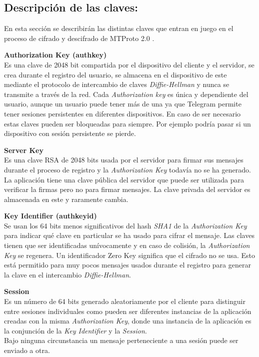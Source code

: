 \subsection{Descripción de las claves:}
En esta sección se describirán las distintas claves que entran en juego en el proceso de cifrado y descifrado de MTProto 2.0 \cite{telegram2}.

\begin{description}
	\item \textbf{Authorization Key (auth\textunderscore key)}\\
	Es una clave de 2048 bit compartida por el dispositivo del cliente y el servidor, se crea durante el registro del usuario, se almacena en el dispositivo de este mediante el protocolo de intercambio de claves \emph{Diffie-Hellman} y nunca se transmite a través de la red. Cada \emph{Authorization key} es única y dependiente del usuario, aunque un usuario puede tener más de una ya que Telegram permite tener sesiones persistentes en diferentes dispositivos. En caso de ser necesario estas claves pueden ser bloqueadas para siempre. Por ejemplo podría pasar si un dispositivo con sesión persistente se pierde.

	\item \textbf{Server Key}\\
	Es una clave RSA de 2048 bits usada por el servidor para firmar sus mensajes durante el proceso de registro y la \emph{Authorization Key} todavía no se ha generado. La aplicación tiene una clave pública del servidor que puede ser utilizada para verificar la firmas pero no para firmar mensajes. La clave privada del servidor es almacenada en este y raramente cambia.

	\item \textbf{Key Identifier (auth\textunderscore key\textunderscore id)}\\
	Se usan los 64 bits menos significativos del hash \emph{SHA1} de la \emph{Authorization Key} para indicar qué clave en particular se ha usado para cifrar el mensaje. Las claves tienen que ser identificadas unívocamente y en caso de colisión, la \emph{Authorization Key} se regenera. Un identificador Zero Key significa que el cifrado no se usa. Esto está permitido para muy pocos mensajes usados durante el registro para generar la clave en el intercambio \emph{Diffie-Hellman}.
	
	\item \textbf{Session}\\
	Es un número de 64 bits generado aleatoriamente por el cliente para distinguir entre sesiones individuales como pueden ser diferentes instancias de la aplicación creadas con la misma \emph{Authorization Key}, donde una instancia de la aplicación es la conjunción de la \emph{Key Identifier} y la \emph{Session}.\\
	Bajo ninguna circunstancia un mensaje perteneciente a una sesión puede ser enviado a otra.


\end{description}
